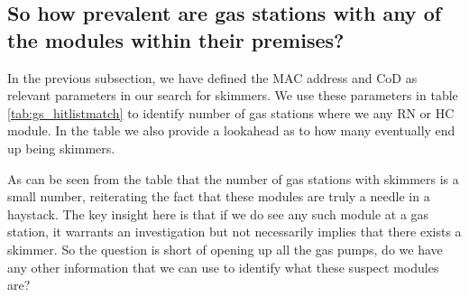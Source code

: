 \subsection {So how prevalent are gas stations with any of the modules within their premises?}

In the previous subsection, we have defined the MAC address and CoD as relevant parameters in our search for skimmers. We use these parameters in table \ref{tab:gs_hitlistmatch} to identify number of gas stations where we any RN or HC module. In the table we also provide a lookahead as to how many eventually end up being skimmers.

\begin{table}
\centering
{}

\caption{Distribution of number of gas stations in each state where we observed one or more Module $x$ (Mod$_x$) shown as A/B (A: Number of gas stations where a module was seen, B: Number of gas stations where skimmers were eventually recovered)}
\label{tab:gs_hitlistmatch}
\end{table}

As can be seen from the table that the number of gas stations with skimmers is a small number, reiterating the fact that these modules are truly a needle in a haystack. The key insight here is that if we do see any such module at a gas station, it warrants an investigation but not necessarily implies that there exists a skimmer. So the question is short of opening up all the gas pumps, do we have any other information that we can use to identify what these suspect modules are?

